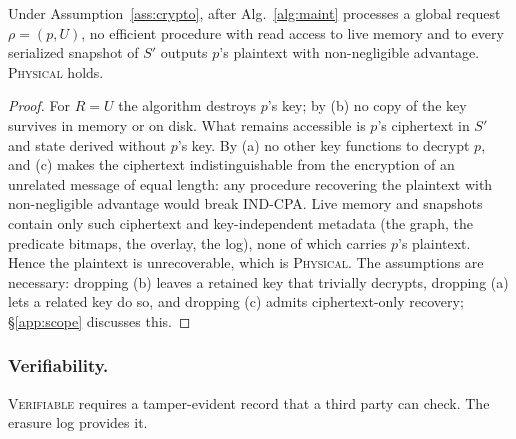 \documentclass[sigconf, nonacm, review]{acmart}
\begin{document}
\begin{lemma}
\label{lem:physical}
Under Assumption~\ref{ass:crypto}, after Alg.~\ref{alg:maint} processes a
global request $\rho=(p,U)$, no efficient procedure with read access to live
memory and to every serialized snapshot of $S'$ outputs $p$'s plaintext with
non-negligible advantage. \textsc{Physical} holds.
\end{lemma}
\begin{proof}
For $R=U$ the algorithm destroys $p$'s key; by (b) no copy of the key survives
in memory or on disk. What remains accessible is $p$'s ciphertext in $S'$ and
state derived without $p$'s key. By (a) no other key functions to decrypt $p$,
and (c) makes the ciphertext indistinguishable from the encryption of an
unrelated message of equal length: any procedure recovering the plaintext with
non-negligible advantage would break IND-CPA. Live memory and snapshots
contain only such ciphertext and key-independent metadata (the graph, the
predicate bitmaps, the overlay, the log), none of which carries $p$'s
plaintext. Hence the plaintext is unrecoverable, which is \textsc{Physical}.
The assumptions are necessary: dropping (b) leaves a retained key that
trivially decrypts, dropping (a) lets a related key do so, and dropping (c)
admits ciphertext-only recovery; \S\ref{app:scope} discusses this.
\end{proof}

\subsubsection{Verifiability.}
\label{app:correct-ver}
\textsc{Verifiable} requires a tamper-evident record that a third party can
check. The erasure log provides it.
\end{document}
